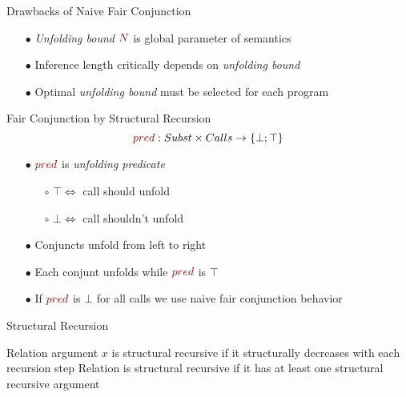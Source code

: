 \documentclass[14pt,aspectratio=169]{beamer}
\newcommand{\set}[1]{\{#1\}}
\theoremstyle{definition}
\begin{document}
\begin{frame}[fragile]{Drawbacks of Naive Fair Conjunction}
\begin{itemize}
    \item[$\bullet$] \emph{Unfolding bound} $\textcolor{myRed}{N}$ is global parameter of semantics
    \vskip5mm
    \item[$\bullet$] Inference length critically depends on \emph{unfolding bound}
    \vskip5mm
    \item[$\bullet$] Optimal \emph{unfolding bound} must be selected for each program
\end{itemize}
\end{frame}

\begin{frame}[fragile]{Fair Conjunction by Structural Recursion}
$$\textcolor{myRed}{pred} : Subst \times Calls \rightarrow \set{\bot; \top}$$
\vskip5mm
\begin{itemize}
    \item[$\bullet$] $\textcolor{myRed}{pred}$ is \emph{unfolding predicate}
    \begin{itemize}
        \normalsize	
        \item[$\circ$] $\top \Leftrightarrow$ call should unfold
        \item[$\circ$] $\bot \Leftrightarrow$ call shouldn't unfold
    \end{itemize}
    \item[$\bullet$] Conjuncts unfold from left to right
    \item[$\bullet$] Each conjunt unfolds while $\textcolor{myRed}{pred}$ is $\top$
    \item[$\bullet$] If $\textcolor{myRed}{pred}$ is $\bot$ for all calls we use naive fair conjunction behavior
    
\end{itemize}
\end{frame}

\begin{frame}[fragile]{Structural Recursion}
\begin{center}
Relation argument $x$ is structural recursive if it structurally decreases with each recursion step
\vskip1cm
Relation is structural recursive if it has at least one structural recursive argument
\end{center}
\end{frame}
\end{document}
